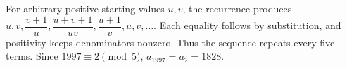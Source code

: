 For arbitrary positive starting values $u,v$, the recurrence produces $u,v,\dfrac{v+1}{u},\dfrac{u+v+1}{uv},\dfrac{u+1}{v},u,v,\ldots$. Each equality follows by substitution, and positivity keeps denominators nonzero. Thus the sequence repeats every five terms. Since $1997\equiv2\pmod5$, $a_{1997}=a_2=\boxed{1828}$.
